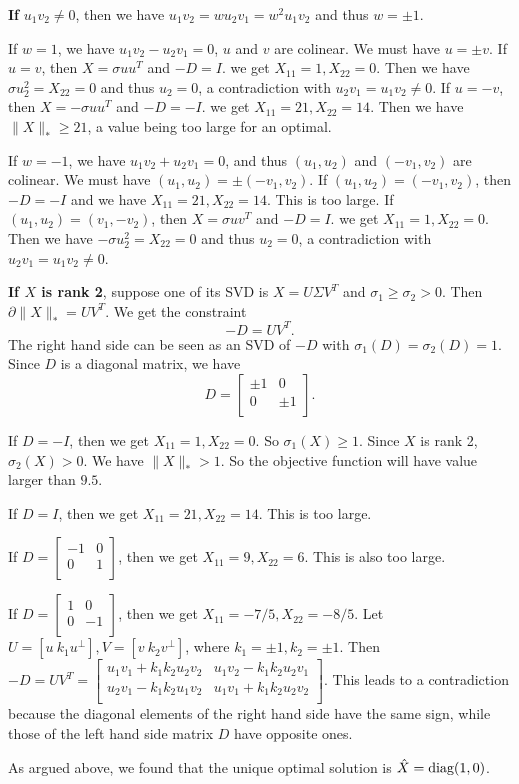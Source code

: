 \textbf{If} $u_1v_2\ne0$,
then we have $u_1v_2=wu_2v_1=w^2u_1v_2$
and thus $w=\pm1$.

If $w=1$,
we have $u_1v_2-u_2v_1=0$,
\ie $u$ and $v$ are colinear.
We must have $u=\pm v$.
If $u=v$,
then $X=\sigma uu^T$ and $-D=I$.
we get $X_{11}=1, X_{22}=0$.
Then we have $\sigma u_2^2=X_{22}=0$
and thus $u_2=0$,
a contradiction with $u_2v_1=u_1v_2\ne0$.
If $u=-v$,
then $X=-\sigma uu^T$ and $-D=-I$.
we get $X_{11}=21, X_{22}=14$.
Then we have $\|X\|_*\ge21$,
a value being too large for an optimal.

If $w=-1$,
we have $u_1v_2+u_2v_1=0$,
and thus $(u_1,u_2)$ and $(-v_1,v_2)$ are colinear.
We must have $(u_1,u_2)=\pm(-v_1,v_2)$.
If $(u_1,u_2)=(-v_1,v_2)$,
then $-D=-I$ and we have $X_{11}=21, X_{22}=14$.
This is too large.
If $(u_1,u_2)=(v_1,-v_2)$,
then $X=\sigma uv^T$ and $-D=I$.
we get $X_{11}=1, X_{22}=0$.
Then we have $-\sigma u_2^2=X_{22}=0$
and thus $u_2=0$,
a contradiction with $u_2v_1=u_1v_2\ne0$.

\textbf{If $X$ is rank 2},
suppose one of its SVD is $X=U\Sigma V^T$
and $\sigma_1\ge\sigma_2>0$.
Then $\partial\|X\|_*=UV^T$.
We get the constraint
\begin{equation}
    -D=UV^T.
\end{equation}
The right hand side can be seen as an SVD of $-D$
with $\sigma_1(D)=\sigma_2(D)=1$.
Since $D$ is a diagonal matrix,
we have
\begin{equation}
    D=
    \begin{bmatrix}
        \pm1 & 0    \\
        0    & \pm1 \\
    \end{bmatrix}.
\end{equation}

If $D=-I$,
then we get $X_{11}=1, X_{22}=0$.
So $\sigma_1(X)\ge1$.
Since $X$ is rank 2,
$\sigma_2(X)>0$.
We have $\|X\|_*>1$.
So the objective function will have value larger than $9.5$.

If $D=I$,
then we get $X_{11}=21, X_{22}=14$.
This is too large.

If $D=
    \begin{bmatrix}
        -1 & 0 \\
        0  & 1 \\
    \end{bmatrix}$,
then we get $X_{11}=9, X_{22}=6$.
This is also too large.

If $D=
    \begin{bmatrix}
        1 & 0  \\
        0 & -1 \\
    \end{bmatrix}$,
then we get $X_{11}=-7/5, X_{22}=-8/5$.
Let $U=[u\ k_1u^\perp],V=[v\ k_2v^\perp]$,
where $k_1=\pm1,k_2=\pm1$.
Then $-D=UV^T=\begin{bmatrix}
        u_1v_1+k_1k_2u_2v_2 & u_1v_2-k_1k_2u_2v_1 \\
        u_2v_1-k_1k_2u_1v_2 & u_1v_1+k_1k_2u_2v_2 \\
    \end{bmatrix}$.
This leads to a contradiction
because the diagonal elements of the right hand side have the same sign,
while those of the left hand side matrix $D$ have opposite ones.

As argued above,
we found that the unique optimal solution is $\hat X={\text{diag}}(1,0)$.
